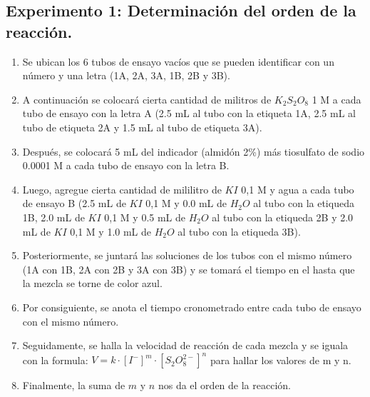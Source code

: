 \documentclass[../main.tex]{subfiles}
\begin{document}
    \subsection{Experimento 1: Determinación del orden de la reacción.}
    \begin{enumerate}
    \item Se ubican los 6 tubos de ensayo vacíos que se pueden identificar con un número y una letra (1A, 2A, 3A, 1B, 2B y 3B).
    \item A continuación se colocará cierta cantidad de militros de $K_2S_2O_8$ 1 M a cada tubo de ensayo con la letra A (2.5 mL al tubo con la etiqueta 1A, 2.5 mL al tubo de etiqueta 2A y 1.5 mL al tubo de etiqueta 3A).
    \item Después, se colocará 5 mL del indicador (almidón 2\%) más tiosulfato de sodio 0.0001 M  a cada tubo de ensayo con la letra B.
    \item Luego, agregue cierta cantidad de mililitro de $KI$ 0,1 M y agua a cada tubo de ensayo B (2.5 mL de $KI$ 0,1 M y 0.0 mL de $H_2O$  al tubo con la etiqueda 1B,  2.0 mL de $KI$ 0,1 M y 0.5 mL de $H_2O$  al tubo con la etiqueda 2B y 2.0 mL de $KI$ 0,1 M y 1.0 mL de $H_2O$  al tubo con la etiqueda 3B).
    \item Posteriormente, se juntará las soluciones de los tubos con el mismo número (1A con 1B, 2A con 2B y 3A con 3B) y se tomará el tiempo en el hasta que la mezcla se torne de color azul.
    \item Por consiguiente, se anota el tiempo cronometrado entre cada tubo de ensayo con el mismo número.
    \item Seguidamente, se halla la velocidad de reacción de cada mezcla y se iguala con la formula: $V=k\cdot[I^{-}]^m\cdot[S_2O_8^{2-}]^n$ para hallar los valores de m y n.
    \item Finalmente, la suma de $m$ y $n$ nos da el orden de la reacción.
    \end{enumerate}
\end{document}
